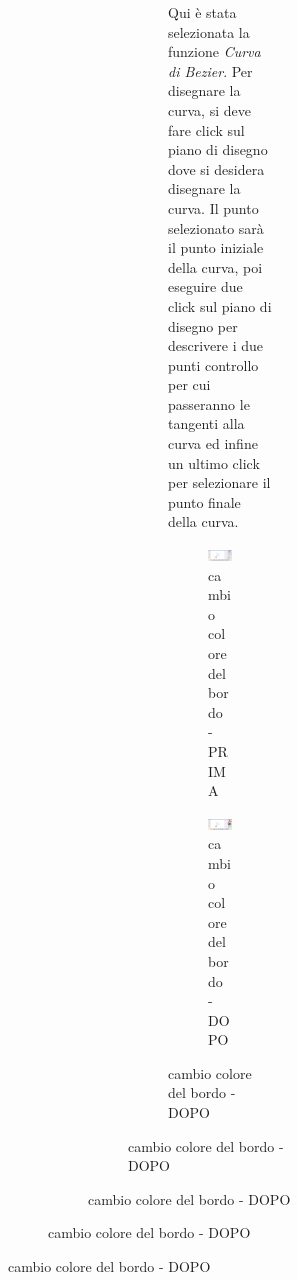 \begin{figure}[!ht]
\begin{figure}[!ht]
\begin{figure}[!ht]
\begin{figure}[!ht]
\begin{figure}[!ht]
\vspace{100pt}
Qui \`e stata selezionata la funzione \textit{Curva di Bezier}. Per disegnare la curva, si deve fare click sul piano di disegno dove si desidera disegnare la curva. Il punto selezionato sar\`a il punto iniziale della curva, poi eseguire due click sul piano di disegno per descrivere i due punti controllo per cui passeranno le tangenti alla curva ed infine un ultimo click per selezionare il punto finale della curva.

\begin{figure}[!ht]
\centering
\includegraphics[scale=0.4]{images/colore_bordo_prima.png}
\caption{cambio colore del bordo  - PRIMA}
\end{figure} 

\begin{figure}[!ht]
\centering
\includegraphics[scale=0.4]{images/colore_bordo_dopo.png}
\caption{cambio colore del bordo  - DOPO}
\end{figure} 



\end{figure}
\end{figure}
\end{figure}
\end{figure}
\end{figure}
